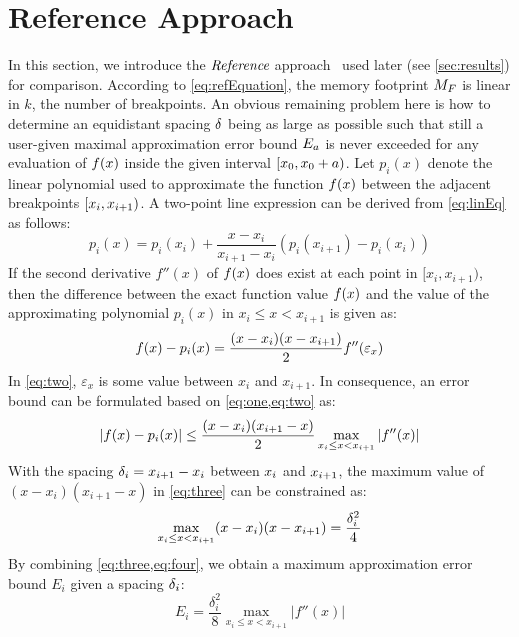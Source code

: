 \section{Reference Approach}
\label{sec:reference}
In this section, we introduce the $\textit{Reference}$ approach~\cite{MATLAB:reference} used later (see \cref{sec:results}) for comparison.
According to \cref{eq:refEquation}, the memory footprint $M_{F}$ is linear in $k$, the number of breakpoints.
An obvious remaining problem here is how to determine an equidistant spacing $\delta_{ }$ being as large as possible such that still a user-given maximal approximation error bound $E_a$ is never exceeded for any evaluation of $f(x)$ inside the given interval $[x_{0}, x_{0}+a)$.
Let $p_i(x)$ denote the linear polynomial used to approximate the function $f(x)$ between the adjacent breakpoints $[x_{i},x_{i+1})$.
A two-point line expression can be derived from \cref{eq:linEq} as follows: 
\begin{equation}
p_i(x)=p_i(x_i)+\frac{x-x_i}{x_{i+1}-x_i}(p_i(x_{i+1})-p_i(x_i))
\label{eq:one}
\end{equation}
If the second derivative $f''(x)$ of $f(x)$ does exist at each point in $[x_i,x_{i+1})$, then the difference between the exact function value $f(x)$ and the value of the approximating polynomial $p_i(x)$ in $x_i \leq x < x_{i+1}$ is given as:
\begin{equation}
f(x)-p_i(x)=\frac{(x-x_i)(x-x_{i+1})}{2} f''(\varepsilon_x)
\label{eq:two}
\end{equation}
In \cref{eq:two}, $\varepsilon_x$ is some value between  $x_i$ and $x_{i+1}$.
In consequence, an error bound can be formulated based on \cref{eq:one,eq:two} as:
\begin{equation}
|f(x)-p_i(x)| \leq \frac{(x-x_i)(x_{i+1}-x)}{2} \max_{x_i\leq x < x_{i+1}} |f''(x)|
\label{eq:three}
\end{equation} 
With the spacing $\delta_{i}=x_{i+1}-x_{i}$ between $x_{i}$ and $x_{i+1}$, the maximum value of $(x-x_i)(x_{i+1}-x)$ in \cref{eq:three} can be constrained as:
\begin{equation}\label{eq:four} 
\max_{x_i \leq x< x_{i+1}} (x-x_i)(x-x_{i+1}) = \frac{\delta_{i}^2}{4}
\end{equation}
By combining \cref{eq:three,eq:four}, we obtain a maximum approximation error bound $E_i$ given a spacing $\delta_{i}$:
\begin{equation}\label{eq:five}
E_i = \frac{\delta_i^2}{8} \max_{x_i\leq x < x_{i+1}} |f''(x)|
\end{equation}
